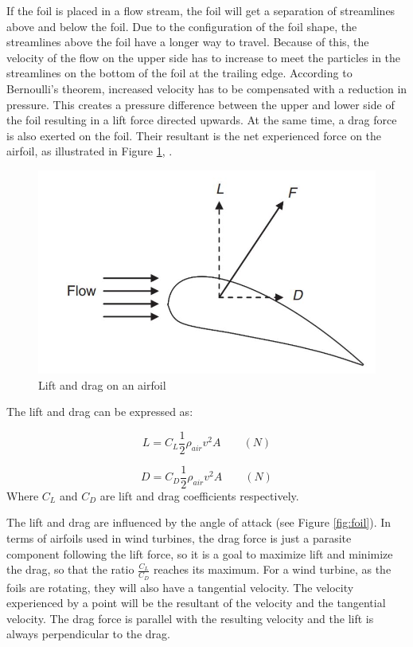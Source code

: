 \noindent If the foil is placed in a flow stream, the foil will get a separation of streamlines above and below the foil. Due to the configuration of the foil shape, the streamlines above the foil have a longer way to travel. Because of this, the velocity of the flow on the upper side has to increase to meet the particles in the streamlines on the bottom of the foil at the trailing edge. According to Bernoulli's theorem, increased velocity has to be compensated with a reduction in pressure. This creates a pressure difference between the upper and lower side of the foil resulting in a lift force directed upwards. At the same time, a drag force is also exerted on the foil. Their resultant is the net experienced force on the airfoil, as illustrated in Figure \ref{fig:liftdrag}, \cite{MATHEW2012}. 

\begin{figure}[H]
\centering
\includegraphics[scale=0.6]{figures/liftdrag}
\caption[$\; \:$Lift and drag on an airfoil]{Lift and drag on an airfoil \cite{MATHEW2012} }
 \label{fig:liftdrag}
\end{figure}

 \noindent The lift and drag can be expressed as:

 \begin{equation}
    L = C_L\frac{1}{2}\rho_{air} v^2 A \qquad (N)
\end{equation}

\begin{equation}
    D = C_D\frac{1}{2}\rho_{air} v^2 A \qquad (N)
\end{equation}
Where $C_L$ and $C_D$ are lift and drag coefficients respectively.\newline 
\newline

\noindent The lift and drag are influenced by the angle of attack (see Figure \ref{fig:foil}). In terms of airfoils used in wind turbines, the drag force is just a parasite component following the lift force, so it is a goal to maximize lift and minimize the drag, so that the ratio $\frac{C_L}{C_D}$ reaches its maximum. For a wind turbine, as the foils are rotating, they will also have a tangential velocity. The velocity experienced by a point will be the resultant of the velocity and the tangential velocity. The drag force is parallel with the resulting velocity and the lift is always perpendicular to the drag. 

